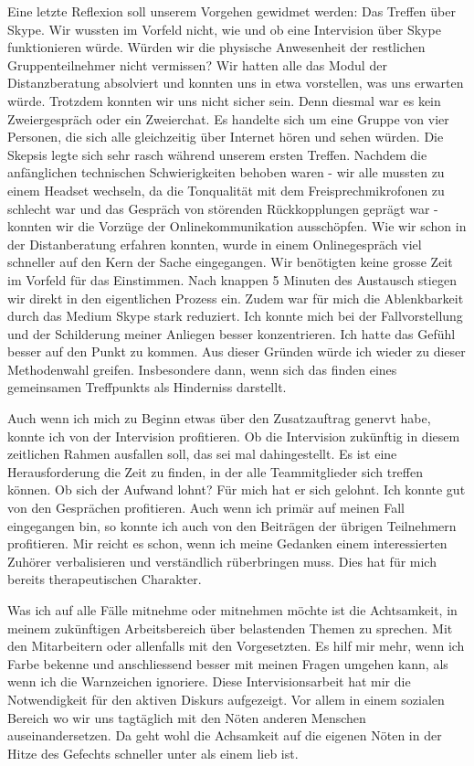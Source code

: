 Eine letzte Reflexion soll unserem Vorgehen gewidmet werden: Das Treffen über Skype. Wir wussten im Vorfeld nicht, wie und ob eine Intervision über Skype funktionieren würde. Würden wir die physische Anwesenheit der restlichen Gruppenteilnehmer nicht vermissen? Wir hatten alle das Modul der Distanzberatung absolviert und konnten uns in etwa vorstellen, was uns erwarten würde. Trotzdem konnten wir uns nicht sicher sein. Denn diesmal war es kein Zweiergespräch oder ein Zweierchat. Es handelte sich um eine Gruppe von vier Personen, die sich alle gleichzeitig über Internet hören und sehen würden. Die Skepsis legte sich sehr rasch während unserem ersten Treffen. Nachdem die anfänglichen technischen Schwierigkeiten behoben waren - wir alle mussten zu einem Headset wechseln, da die Tonqualität mit dem Freisprechmikrofonen zu schlecht war und das Gespräch von störenden Rückkopplungen geprägt war - konnten wir die Vorzüge der Onlinekommunikation ausschöpfen. Wie wir schon in der Distanberatung erfahren konnten, wurde in einem Onlinegespräch viel schneller auf den Kern der Sache eingegangen. Wir benötigten keine grosse Zeit im Vorfeld für das Einstimmen. Nach knappen 5 Minuten des Austausch stiegen wir direkt in den eigentlichen Prozess ein. Zudem war für mich die Ablenkbarkeit durch das Medium Skype stark reduziert. Ich konnte mich bei der Fallvorstellung und der Schilderung meiner Anliegen besser konzentrieren. Ich hatte das Gefühl besser auf den Punkt zu kommen. Aus dieser Gründen würde ich wieder zu dieser Methodenwahl greifen. Insbesondere dann, wenn sich das finden eines gemeinsamen Treffpunkts als Hinderniss darstellt. 

Auch wenn ich mich zu Beginn etwas über den Zusatzauftrag genervt habe, konnte ich von der Intervision profitieren. Ob die Intervision zukünftig in diesem zeitlichen Rahmen ausfallen soll, das sei mal dahingestellt. Es ist eine Herausforderung die Zeit zu finden, in der alle Teammitglieder sich treffen können. Ob sich der Aufwand lohnt? Für mich hat er sich gelohnt. Ich konnte gut von den Gesprächen profitieren. Auch wenn ich primär auf meinen Fall eingegangen bin, so konnte ich auch von den Beiträgen der übrigen Teilnehmern profitieren. Mir reicht es schon, wenn ich meine Gedanken einem interessierten Zuhörer verbalisieren und verständlich rüberbringen muss. Dies hat für mich bereits therapeutischen Charakter.

Was ich auf alle Fälle mitnehme oder mitnehmen möchte ist die Achtsamkeit, in meinem zukünftigen Arbeitsbereich über belastenden Themen zu sprechen. Mit den Mitarbeitern oder allenfalls mit den Vorgesetzten. Es hilf mir mehr, wenn ich Farbe bekenne und anschliessend besser mit meinen Fragen umgehen kann, als wenn ich die Warnzeichen ignoriere. Diese Intervisionsarbeit hat mir die Notwendigkeit für den aktiven Diskurs aufgezeigt. Vor allem in einem sozialen Bereich wo wir uns tagtäglich mit den Nöten anderen Menschen auseinandersetzen. Da geht wohl die Achsamkeit auf die eigenen Nöten in der Hitze des Gefechts schneller unter als einem lieb ist.

